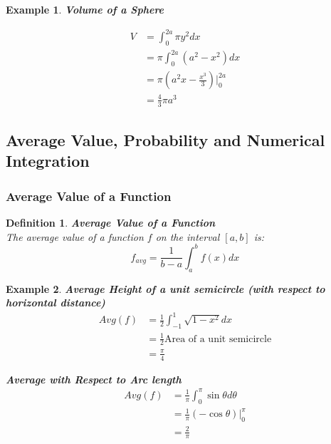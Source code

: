 \documentclass[10pt, a4paper]{article}
\newtheorem{definition}{Definition}
\newtheorem{example}{Example}
\begin{document}
\begin{example}
    \textbf{Volume of a Sphere}
    \begin{center}
    \end{center}
    \begin{align*}
        V &= \int_{0}^{2a} \pi y^2dx \\
        &= \pi\int_{0}^{2a} (a^2 - x^2)dx \\
        &= \pi\left(a^2x - \frac{x^3}{3}\right)\Big|_{0}^{2a} \\
        &= \frac{4}{3}\pi a^3
    \end{align*}
\end{example}

\subsection{Average Value, Probability and Numerical Integration}
\subsubsection*{Average Value of a Function}
\begin{definition}
    \textbf{Average Value of a Function} \\
    The average value of a function $f$ on the interval $[a, b]$ is:
    \[\boxed{f_{avg} = \frac{1}{b-a}\int_a^b f(x)dx}\]
\end{definition}

\begin{example}
    \textbf{Average Height of a unit semicircle (with respect to horizontal distance)} \\
    \begin{align*}
        Avg(f) &= \frac{1}{2}\int_{-1}^{1}\sqrt{1-x^2}dx \\
        &= \frac{1}{2}\text{Area of a unit semicircle} \\
        &= \frac{\pi}{4}
    \end{align*}

    \textbf{Average with Respect to Arc length} \\    
    \begin{align*}
        Avg(f) &= \frac{1}{\pi}\int_{0}^{\pi}\sin \theta d\theta \\
        &= \frac{1}{\pi}\left(-\cos \theta\right)\Big|_{0}^{\pi} \\
        &= \frac{2}{\pi}
    \end{align*} 
\end{example}
\end{document}
